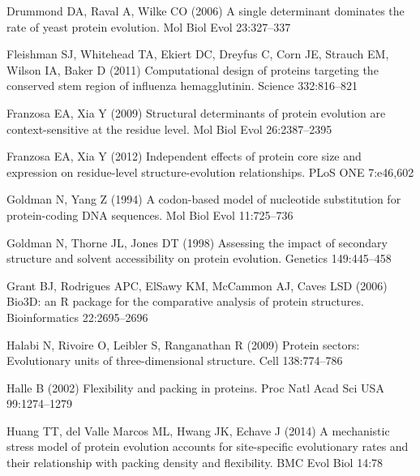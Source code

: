 \documentclass[smallextended]{svjour3}
\begin{document}
\begin{thebibliography}{55}
Drummond DA, Raval A, Wilke CO (2006) A single determinant dominates the rate
  of yeast protein evolution. Mol Biol Evol 23:327--337

Fleishman SJ, Whitehead TA, Ekiert DC, Dreyfus C, Corn JE, Strauch EM, Wilson
  IA, Baker D (2011) Computational design of proteins targeting the conserved
  stem region of influenza hemagglutinin. Science 332:816--821

Franzosa EA, Xia Y (2009) Structural determinants of protein evolution are
  context-sensitive at the residue level. Mol Biol Evol 26:2387--2395

Franzosa EA, Xia Y (2012) Independent effects of protein core size and
  expression on residue-level structure-evolution relationships. PLoS ONE
  7:e46,602

Goldman N, Yang Z (1994) A codon-based model of nucleotide substitution for
  protein-coding {DNA} sequences. Mol Biol Evol 11:725--736

Goldman N, Thorne JL, Jones DT (1998) Assessing the impact of secondary
  structure and solvent accessibility on protein evolution. Genetics
  149:445--458

Grant BJ, Rodrigues APC, ElSawy KM, McCammon AJ, Caves LSD (2006) {Bio3D:} an
  {R} package for the comparative analysis of protein structures.
  Bioinformatics 22:2695--2696

Halabi N, Rivoire O, Leibler S, Ranganathan R (2009) Protein sectors:
  Evolutionary units of three-dimensional structure. Cell 138:774--786

Halle B (2002) Flexibility and packing in proteins. Proc Natl Acad Sci USA
  99:1274--1279

Huang TT, {del Valle Marcos} ML, Hwang JK, Echave J (2014) A mechanistic stress
  model of protein evolution accounts for site-specific evolutionary rates and
  their relationship with packing density and flexibility. BMC Evol Biol 14:78


\end{thebibliography}
\end{document}
